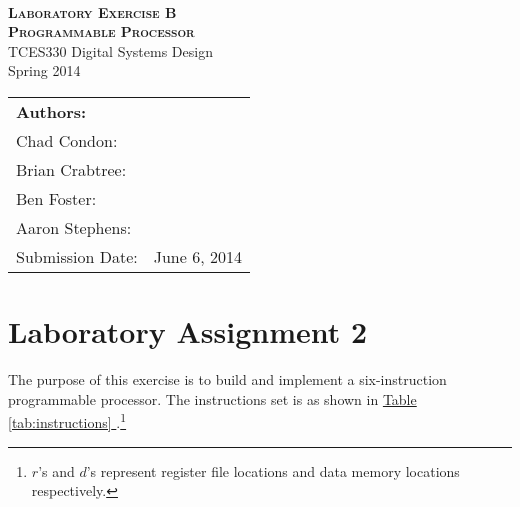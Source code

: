 \documentclass[12pt]{article}
\begin{document}
\begin{titlepage}
    \center
    \qquad\\[7cm]
    \textsc{\huge \bfseries Laboratory Exercise B} \\[.5cm]
    \textsc{\huge \bfseries Programmable Processor} \\[1.0cm]
    {\large TCES330 Digital Systems Design} \\[.5cm]
    {\large Spring 2014} \\[1.5cm]
    
    \begin{tabular}{ll}
        \multicolumn{2}{l}{\textbf{Authors:}}   \\
        Chad Condon:        & \underline{\hspace{5cm}} \\
        Brian Crabtree:     & \underline{\hspace{5cm}} \\
        Ben Foster:         & \underline{\hspace{5cm}} \\
        Aaron Stephens:     & \underline{\hspace{5cm}} \\
        Submission Date:    & June 6, 2014
    \end{tabular}
    
\end{titlepage}

\tableofcontents
\pagebreak

\section*{Laboratory Assignment 2}  \FloatBarrier

The purpose of this exercise is to build and implement a six-instruction programmable processor.
The instructions set is as shown in \hyperref[tab:instructions]{Table \ref*{tab:instructions} }.\footnote{$r$'s and $d$'s represent register file locations and data memory locations respectively.}
\end{document}

